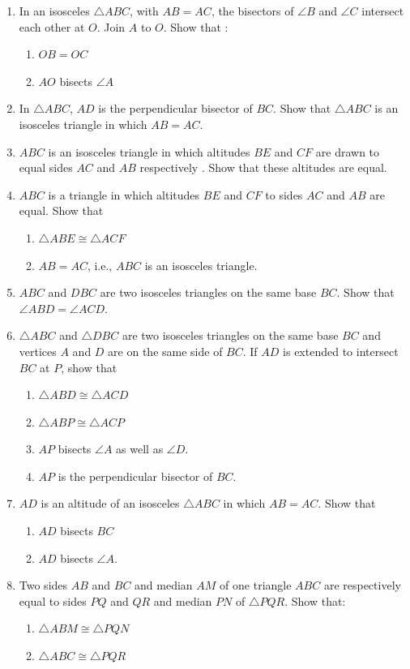 \begin{enumerate}[label=\arabic*.,ref=\thesubsection.\theenumi]
\item In an isosceles $\triangle ABC$, with $AB = AC$, the bisectors of $\angle B$ and $\angle C$ intersect each other at $O$. Join $A$ to $O$. Show that :
\begin{enumerate} 
\item $OB = OC$ 
\item $AO$ bisects $\angle A$
\end{enumerate}
\item In $\triangle ABC$, $AD$ is the perpendicular bisector of $BC$. Show that $\triangle ABC$ is an isosceles triangle in which $AB = AC$.
\item $ABC$ is an isosceles triangle in which altitudes $BE$ and $CF$ are drawn to equal sides $AC$ and $AB$ respectively . Show that these altitudes are equal.
%
\item $ABC$ is a triangle in which altitudes $BE$ and $CF$ to sides $AC$ and $AB$ are equal. Show that
%
\begin{enumerate} 
\item $\triangle  ABE \cong  \triangle  ACF $
\item  $AB = AC$, i.e., $ABC$ is an isosceles triangle.
\end{enumerate}
%
\item $ABC$ and $DBC$ are two isosceles triangles on the same base $BC$. Show that $\angle ABD = \angle ACD$.
%
\item  $\triangle  ABC$ and $\triangle  DBC$ are two isosceles triangles on the same base $BC$ and vertices $A$ and $D$ are on the same side of $BC$. If $AD$ is extended to intersect $BC$ at $P$, show that
\begin{enumerate}
\item $\triangle  ABD \cong  \triangle  ACD $
\item $\triangle  ABP \cong  \triangle  ACP $
\item $AP$ bisects $\angle  A$ as well as $\angle  D$. 
\item $AP$ is the perpendicular bisector of $BC$.
\end{enumerate}
\item $AD$ is an altitude of an isosceles $\triangle ABC$ in which $AB = AC$. Show that 
\begin{enumerate}
\item $AD$ bisects $BC$
\item $AD$ bisects $\angle  A$. 
\end{enumerate}

\item  Two sides $AB$ and $BC$ and median $AM$ of one triangle $ABC$ are respectively equal to sides $PQ$ and $QR$ and median $PN$ of $\triangle  PQR$. Show that: 
\begin{enumerate}
\item $\triangle  ABM \cong  \triangle  PQN $
\item $\triangle  ABC \cong  \triangle  PQR$
\end{enumerate}

\end{enumerate}
